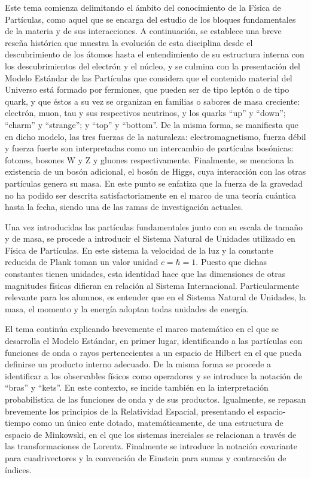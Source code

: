 Este tema comienza delimitando el ámbito del conocimiento de la Física de Partículas, como aquel que se encarga del estudio de los bloques fundamentales de la materia y de sus interacciones. A continuación, se establece una breve reseña histórica que muestra la evolución de esta disciplina desde el descubrimiento de los átomos hasta el entendimiento de su estructura interna con los descubrimientos del electrón y el núcleo, y se culmina con la presentación del Modelo Estándar de las Partículas que considera que el contenido material del Universo está formado por fermiones, que pueden ser de tipo leptón o de tipo quark, y que éstos a su vez se organizan en familias o sabores de masa creciente: electrón, muon, tau y sus respectivos neutrinos, y los quarks ``up'' y ``down''; ``charm'' y ``strange''; y ``top'' y ``bottom''. De la misma forma, se manifiesta que en dicho modelo, las tres fuerzas de la naturaleza: electromagnetismo, fuerza débil y fuerza fuerte son interpretadas como un intercambio de partículas bosónicas: fotones, bosones W y Z y gluones respectivamente. Finalmente, se menciona la existencia de un bosón adicional, el bosón de Higgs, cuya interacción con las otras partículas genera su masa. En este punto se enfatiza que la fuerza de la gravedad no ha podido ser descrita satisfactoriamente en el marco de una teoría cuántica hasta la fecha, siendo una de las ramas de investigación actuales.

Una vez introducidas las partículas fundamentales junto con su escala de tamaño y de masa, se procede a introducir el Sistema Natural de Unidades utilizado en Física de Partículas. En este sistema la velocidad de la luz y la constante reducida de Plank toman un valor unidad $c=\hbar=1$. Puesto que dichas constantes tienen unidades, esta identidad hace que las dimensiones de otras magnitudes físicas difieran en relación al Sistema Internacional. Particularmente relevante para los alumnos, es entender que en el Sistema Natural de Unidades, la masa, el momento y la energía adoptan todas unidades de energía. 

El tema continúa explicando brevemente el marco matemático en el que se desarrolla el Modelo Estándar, en primer lugar, identificando a las partículas con funciones de onda o rayos pertenecientes a un espacio de Hilbert en el que pueda definirse un producto interno adecuado. De la misma forma se procede a identificar a los observables físicos como operadores y se introduce la notación de ``bras'' y ``kets''. En este contexto, se incide también en la interpretación probabilística de las funciones de onda y de sus productos. Igualmente, se repasan brevemente los principios de la Relatividad Espacial, presentando el espacio-tiempo como un único ente dotado, matemáticamente, de una estructura de espacio de Minkowski, en el que los sistemas inerciales se relacionan a través de las transformaciones de Lorentz. Finalmente se introduce la notación covariante para cuadrivectores y la convención de Einstein para sumas y contracción de índices.

